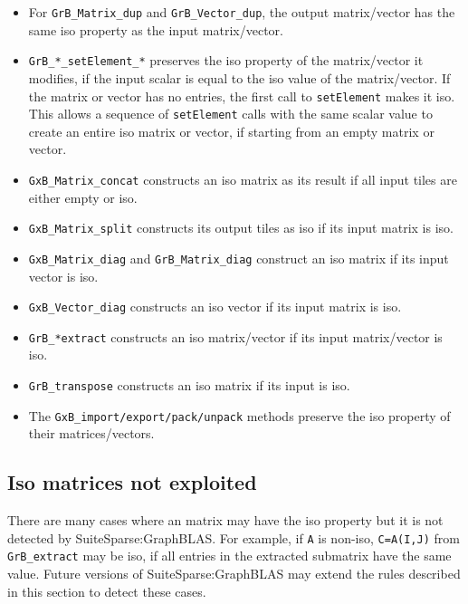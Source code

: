 \documentclass[12pt]{article}
\begin{document}
{\begin{itemize}
\item
For \verb'GrB_Matrix_dup' and \verb'GrB_Vector_dup', the output matrix/vector
has the same iso property as the input matrix/vector.

\item
\verb'GrB_*_setElement_*' preserves the iso property of the matrix/vector it
modifies, if the input scalar is equal to the iso value of the matrix/vector.
If the matrix or vector has no entries, the first call to \verb'setElement'
makes it iso.  This allows a sequence of \verb'setElement' calls with the same
scalar value to create an entire iso matrix or vector, if starting from
an empty matrix or vector.

\item
\verb'GxB_Matrix_concat' constructs an iso matrix as its result if all input
tiles are either empty or iso.

\item
\verb'GxB_Matrix_split' constructs its output tiles as iso if its input
matrix is iso.

\item
\verb'GxB_Matrix_diag' and \verb'GrB_Matrix_diag' construct an iso matrix if
its input vector is iso.

\item
\verb'GxB_Vector_diag' constructs an iso vector if its input matrix is iso.

\item
\verb'GrB_*extract' constructs an iso matrix/vector if its input matrix/vector
is iso.

\item
\verb'GrB_transpose' constructs an iso matrix if its input is iso.

\item
The \verb'GxB_import/export/pack/unpack' methods preserve the iso property
of their matrices/vectors.
\end{itemize}

\subsection{Iso matrices not exploited}

There are many cases where an matrix may have the iso property but it is not
detected by SuiteSparse:GraphBLAS.  For example, if \verb'A' is non-iso,
\verb'C=A(I,J)' from \verb'GrB_extract' may be iso, if all entries in the
extracted submatrix have the same value.  Future versions of
SuiteSparse:GraphBLAS may extend the rules described in this section to detect
these cases.

}
\end{document}
